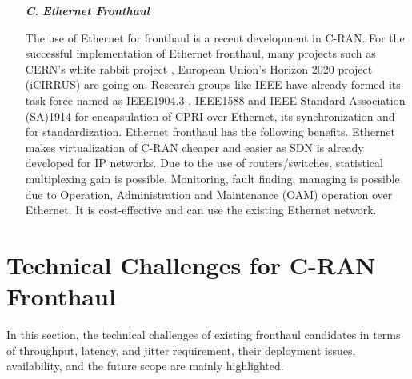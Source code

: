 \begin{multicols}{2}
\begin{itemize}
Wireless fronthaul seems to be an alternate of optical fronthaul. It is cheap. RRH can be installed anywhere due to no physical wire connection, lightweight, less space requirement, and less construction required. So, it is easy to install either in dense urban areas or any hilly region. It takes less time for setup. Due to its many advantages now, many vendors like EBlink, Cablefree are mainly focused on the development of wireless fronthaul. According to one of the vendor Cablefree \cite{art3-key42}, wireless latency is less compared to optical fiber due to the following reason: 1) Optical fiber paths are not in a straight line, 2) Wireless propagation is faster (around 40\%) than optical fiber due to lower refractive index of air than fiber.

\item[{\textit{\textbf{ C.}}}] {\textit{\textbf{Ethernet Fronthaul}}}

The use of Ethernet for fronthaul is a recent development in C-RAN. For the successful implementation of Ethernet fronthaul, many projects such as CERN’s white rabbit project \cite{art3-key44}, European Union’s Horizon 2020 project (iCIRRUS) \cite{art3-key45} are going on. Research groups like IEEE have already formed its task force named as IEEE1904.3 \cite{art3-key46}, IEEE1588 \cite{art3-key47} and IEEE Standard Association (SA)1914 \cite{art3-key48} for encapsulation of CPRI over Ethernet, its synchronization and for standardization. Ethernet fronthaul has the following benefits. Ethernet makes virtualization of C-RAN cheaper and easier as SDN is already developed for IP networks. Due to the use of routers/switches, statistical multiplexing gain is possible. Monitoring, fault finding, managing is possible due to Operation, Administration and Maintenance (OAM) operation over Ethernet. It is cost-effective and can use the existing Ethernet network.
\end{itemize}

\section{Technical Challenges for C-RAN Fronthaul}\label{sect05}

In this section, the technical challenges of existing fronthaul candidates in terms of throughput, latency, and jitter requirement, their deployment issues, availability, and the future scope are mainly highlighted.

\begin{itemize}


\end{itemize}
\end{multicols}
